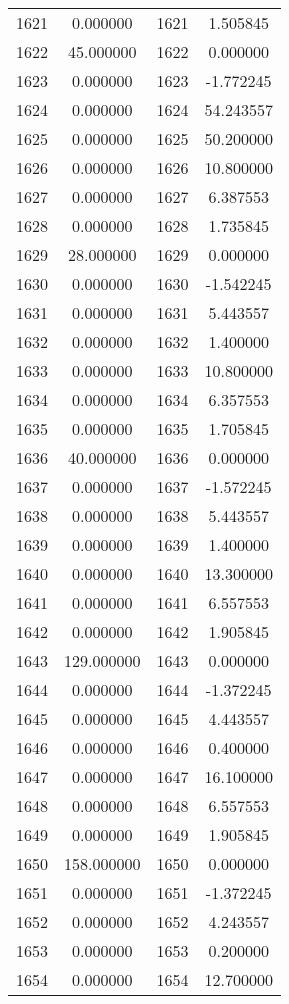 \documentclass[12pt]{article}
\begin{document}
\begin{longtable}{@{}cccc@{}}
1621 & 0.000000 & 1621 & 1.505845 \\
1622 & 45.000000 & 1622 & 0.000000 \\
1623 & 0.000000 & 1623 & -1.772245 \\
1624 & 0.000000 & 1624 & 54.243557 \\
1625 & 0.000000 & 1625 & 50.200000 \\
1626 & 0.000000 & 1626 & 10.800000 \\
1627 & 0.000000 & 1627 & 6.387553 \\
1628 & 0.000000 & 1628 & 1.735845 \\
1629 & 28.000000 & 1629 & 0.000000 \\
1630 & 0.000000 & 1630 & -1.542245 \\
1631 & 0.000000 & 1631 & 5.443557 \\
1632 & 0.000000 & 1632 & 1.400000 \\
1633 & 0.000000 & 1633 & 10.800000 \\
1634 & 0.000000 & 1634 & 6.357553 \\
1635 & 0.000000 & 1635 & 1.705845 \\
1636 & 40.000000 & 1636 & 0.000000 \\
1637 & 0.000000 & 1637 & -1.572245 \\
1638 & 0.000000 & 1638 & 5.443557 \\
1639 & 0.000000 & 1639 & 1.400000 \\
1640 & 0.000000 & 1640 & 13.300000 \\
1641 & 0.000000 & 1641 & 6.557553 \\
1642 & 0.000000 & 1642 & 1.905845 \\
1643 & 129.000000 & 1643 & 0.000000 \\
1644 & 0.000000 & 1644 & -1.372245 \\
1645 & 0.000000 & 1645 & 4.443557 \\
1646 & 0.000000 & 1646 & 0.400000 \\
1647 & 0.000000 & 1647 & 16.100000 \\
1648 & 0.000000 & 1648 & 6.557553 \\
1649 & 0.000000 & 1649 & 1.905845 \\
1650 & 158.000000 & 1650 & 0.000000 \\
1651 & 0.000000 & 1651 & -1.372245 \\
1652 & 0.000000 & 1652 & 4.243557 \\
1653 & 0.000000 & 1653 & 0.200000 \\
1654 & 0.000000 & 1654 & 12.700000 \\

\end{longtable}
\end{document}
